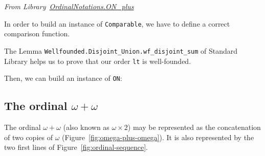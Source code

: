 \vspace{4pt}
\noindent\emph{From Library~\href{../theories/html/hydras.OrdinalNotations.ON_plus.html}{OrdinalNotations.ON\_plus}}




In order to build an instance of \texttt{Comparable}, we have to define a correct comparison function.



\vspace{4pt}



\vspace{4pt}




\vspace{4pt}

The Lemma \texttt{Wellfounded.Disjoint\_Union.wf\_disjoint\_sum} of Standard Library
helps us to prove that our order \texttt{lt} is well-founded.


\vspace{4pt}



\vspace{4pt}

Then, we can build an instance of \texttt{ON}:

\vspace{4pt}









\subsection{The ordinal \texorpdfstring{$\omega+\omega$}{omega + omega}}

The ordinal $\omega+\omega$ (also known as $\omega\times 2$) may be represented as the concatenation 
of two copies of $\omega$ (Figure~\ref{fig:omega-plus-omega}).
It is also represented by the two first lines of Figure~\ref{fig:ordinal-sequence}.

